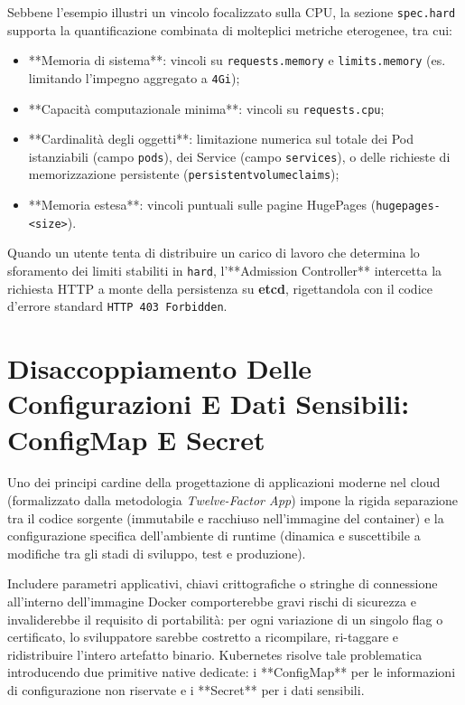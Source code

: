\documentclass[11pt, a4paper]{article}
\begin{document}
Sebbene l'esempio illustri un vincolo focalizzato sulla CPU, la sezione \texttt{spec.hard} supporta la quantificazione combinata di molteplici metriche eterogenee, tra cui:
\begin{itemize}[noitemsep]
    \item **Memoria di sistema**: vincoli su \texttt{requests.memory} e \texttt{limits.memory} (es. limitando l'impegno aggregato a \texttt{4Gi});
    \item **Capacità computazionale minima**: vincoli su \texttt{requests.cpu};
    \item **Cardinalità degli oggetti**: limitazione numerica sul totale dei Pod istanziabili (campo \texttt{pods}), dei Service (campo \texttt{services}), o delle richieste di memorizzazione persistente (\texttt{persistentvolumeclaims});
    \item **Memoria estesa**: vincoli puntuali sulle pagine HugePages (\texttt{hugepages-<size>}).
\end{itemize}

Quando un utente tenta di distribuire un carico di lavoro che determina lo sforamento dei limiti stabiliti in \texttt{hard}, l'**Admission Controller** intercetta la richiesta HTTP a monte della persistenza su \textbf{etcd}, rigettandola con il codice d'errore standard \texttt{HTTP 403 Forbidden}.

\newpage


\section{Disaccoppiamento Delle Configurazioni E Dati Sensibili: ConfigMap E Secret}

Uno dei principi cardine della progettazione di applicazioni moderne nel cloud (formalizzato dalla metodologia \emph{Twelve-Factor App}) impone la rigida separazione tra il codice sorgente (immutabile e racchiuso nell'immagine del container) e la configurazione specifica dell'ambiente di runtime (dinamica e suscettibile a modifiche tra gli stadi di sviluppo, test e produzione).

Includere parametri applicativi, chiavi crittografiche o stringhe di connessione all'interno dell'immagine Docker comporterebbe gravi rischi di sicurezza e invaliderebbe il requisito di portabilità: per ogni variazione di un singolo flag o certificato, lo sviluppatore sarebbe costretto a ricompilare, ri-taggare e ridistribuire l'intero artefatto binario. Kubernetes risolve tale problematica introducendo due primitive native dedicate: i **ConfigMap** per le informazioni di configurazione non riservate e i **Secret** per i dati sensibili.
\end{document}
